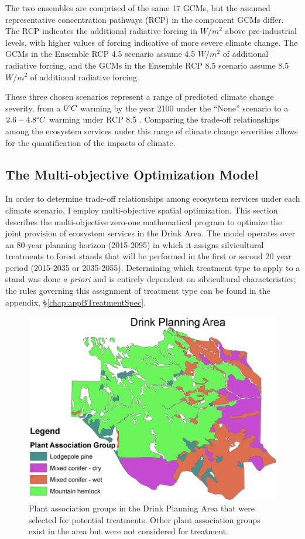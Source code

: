 The two ensembles are comprised of the same 17 GCMs, but the assumed representative concentration pathways (RCP) in the component GCMs differ. The RCP indicates the additional radiative forcing in $W/m^2$ above pre-industrial levels, with higher values of forcing indicative of more severe climate change. The GCMs in the Ensemble RCP 4.5 scenario assume 4.5 $W/m^2$ of additional radiative forcing, and the GCMs in the Ensemble RCP 8.5 scenario assume 8.5 $W/m^2$ of additional radiative forcing.

These three chosen scenarios represent a range of predicted climate change severity, from a $0 \degree C$ warming by the year 2100 under the ``None'' scenario to a $2.6-4.8 \degree C$ warming under RCP 8.5 \cite{ipcc2013climate}. Comparing the trade-off relationships among the ecosystem services under this range of climate change severities allows for the quantification of the impacts of climate.

\subsection{The Multi-objective Optimization Model}
\label{sec:model}
In order to determine trade-off relationships among ecosystem services under each climate scenario, I employ multi-objective spatial optimization. This section describes the multi-objective zero-one mathematical program to optimize the joint provision of ecosystem services in the Drink Area. The model operates over an 80-year planning horizon (2015-2095) in which it assigns silvicultural treatments to forest stands that will be performed in the first or second 20 year period (2015-2035 or 2035-2055). Determining which treatment type to apply to a stand was done \textit{a priori} and is entirely dependent on silvicultural characteristics; the rules governing this assignment of treatment type can be found in the appendix, \S \ref{chap:appBTreatmentSpec}.

\begin{figure}
\centering
\includegraphics[width=.5\textwidth]{../images/DrinkMap_PAGs}
\caption[Plant association groups in the Drink Planning Area]{Plant association groups in the Drink Planning Area that were selected for potential treatments. Other plant association groups exist in the area but were not considered for treatment.}
\label{fig:drinkPAGs}
\end{figure}

